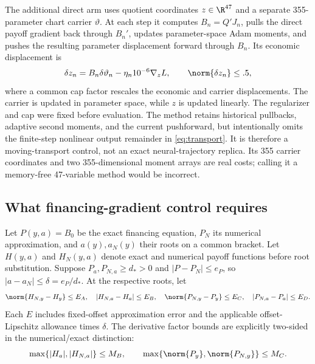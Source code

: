 The additional direct arm uses quotient coordinates $z\in\R^{47}$ and a separate 355-parameter chart carrier $\vartheta$. At each step it computes $B_n=Q'J_n$, pulls the direct payoff gradient back through $B_n'$, updates parameter-space Adam moments, and pushes the resulting parameter displacement forward through $B_n$. Its economic displacement is
\begin{equation}
 \delta z_n=B_n\delta\vartheta_n-\eta_n10^{-6}\nabla_zL,
 \qquad \norm{\delta z_n}\leq .5,\label{eq:moving}
\end{equation}
where a common cap factor rescales the economic and carrier displacements. The carrier is updated in parameter space, while $z$ is updated linearly. The regularizer and cap were fixed before evaluation. The method retains historical pullbacks, adaptive second moments, and the current pushforward, but intentionally omits the finite-step nonlinear output remainder in \eqref{eq:transport}. It is therefore a moving-transport control, not an exact neural-trajectory replica. Its 355 carrier coordinates and two 355-dimensional moment arrays are real costs; calling it a memory-free 47-variable method would be incorrect.

\subsection{What financing-gradient control requires}\label{sec:gradient}
Let $P(y,a)=B_0$ be the exact financing equation, $P_N$ its numerical approximation, and $a(y),a_N(y)$ their roots on a common bracket. Let $H(y,a)$ and $H_N(y,a)$ denote exact and numerical payoff functions before root substitution. Suppose $P_a,P_{N,a}\geq d_*>0$ and $|P-P_N|\leq e_P$, so $|a-a_N|\leq\delta=e_P/d_*$. At the respective roots, let
\[
 \norm{H_{N,y}-H_y}\leq E_A,\quad |H_{N,a}-H_a|\leq E_B,
 \quad \norm{P_{N,y}-P_y}\leq E_C,\quad |P_{N,a}-P_a|\leq E_D.
\]
Each $E$ includes fixed-offset approximation error and the applicable offset-Lipschitz allowance times $\delta$. The derivative factor bounds are explicitly two-sided in the numerical/exact distinction:
\begin{equation}
 \max\{|H_a|,|H_{N,a}|\}\leq M_B,\qquad
 \max\{\norm{P_y},\norm{P_{N,y}}\}\leq M_C.\label{eq:both_versions}
\end{equation}

